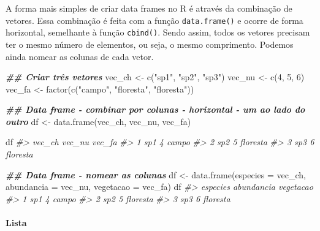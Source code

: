 \documentclass[
]{book}
\newenvironment{Shaded}{\begin{snugshade}}{\end{snugshade}}
\newcommand{\AttributeTok}[1]{\textcolor[rgb]{0.61,0.61,0.61}{#1}}
\newcommand{\CommentTok}[1]{\textcolor[rgb]{0.37,0.37,0.37}{\textit{#1}}}
\newcommand{\DecValTok}[1]{\textcolor[rgb]{0.06,0.06,0.06}{#1}}
\newcommand{\DocumentationTok}[1]{\textcolor[rgb]{0.37,0.37,0.37}{\textbf{\textit{#1}}}}
\newcommand{\FunctionTok}[1]{\textcolor[rgb]{0,0,0}{#1}}
\newcommand{\NormalTok}[1]{#1}
\newcommand{\OtherTok}[1]{\textcolor[rgb]{0.37,0.37,0.37}{#1}}
\newcommand{\StringTok}[1]{\textcolor[rgb]{0.5,0.5,0.5}{#1}}
\begin{document}
A forma mais simples de criar data frames no R é através da combinação de vetores. Essa combinação é feita com a função \texttt{data.frame()} e ocorre de forma horizontal, semelhante à função \texttt{cbind()}. Sendo assim, todos os vetores precisam ter o mesmo número de elementos, ou seja, o mesmo comprimento. Podemos ainda nomear as colunas de cada vetor.

\begin{Shaded}
\begin{Highlighting}[]
\DocumentationTok{\#\# Criar três vetores}
\NormalTok{vec\_ch }\OtherTok{\textless{}{-}} \FunctionTok{c}\NormalTok{(}\StringTok{"sp1"}\NormalTok{, }\StringTok{"sp2"}\NormalTok{, }\StringTok{"sp3"}\NormalTok{)}
\NormalTok{vec\_nu }\OtherTok{\textless{}{-}} \FunctionTok{c}\NormalTok{(}\DecValTok{4}\NormalTok{, }\DecValTok{5}\NormalTok{, }\DecValTok{6}\NormalTok{)}
\NormalTok{vec\_fa }\OtherTok{\textless{}{-}} \FunctionTok{factor}\NormalTok{(}\FunctionTok{c}\NormalTok{(}\StringTok{"campo"}\NormalTok{, }\StringTok{"floresta"}\NormalTok{, }\StringTok{"floresta"}\NormalTok{))}

\DocumentationTok{\#\# Data frame {-} combinar por colunas {-} horizontal {-} um ao lado do outro}
\NormalTok{df }\OtherTok{\textless{}{-}} \FunctionTok{data.frame}\NormalTok{(vec\_ch, vec\_nu, vec\_fa)}

\NormalTok{df}
\CommentTok{\#\textgreater{}   vec\_ch vec\_nu   vec\_fa}
\CommentTok{\#\textgreater{} 1    sp1      4    campo}
\CommentTok{\#\textgreater{} 2    sp2      5 floresta}
\CommentTok{\#\textgreater{} 3    sp3      6 floresta}

\DocumentationTok{\#\# Data frame {-} nomear as colunas}
\NormalTok{df }\OtherTok{\textless{}{-}} \FunctionTok{data.frame}\NormalTok{(}\AttributeTok{especies =}\NormalTok{ vec\_ch, }
                 \AttributeTok{abundancia =}\NormalTok{ vec\_nu, }
                 \AttributeTok{vegetacao =}\NormalTok{ vec\_fa)}
\NormalTok{df}
\CommentTok{\#\textgreater{}   especies abundancia vegetacao}
\CommentTok{\#\textgreater{} 1      sp1          4     campo}
\CommentTok{\#\textgreater{} 2      sp2          5  floresta}
\CommentTok{\#\textgreater{} 3      sp3          6  floresta}
\end{Highlighting}
\end{Shaded}

\hypertarget{lista}{%
\paragraph{Lista}\label{lista}}
\end{document}
